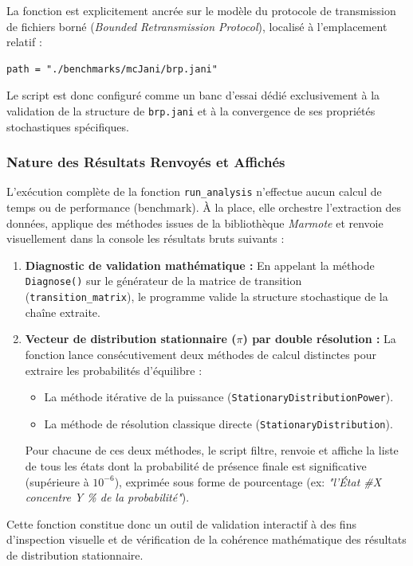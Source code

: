 \documentclass[14pt, a4paper]{extarticle}
\begin{document}
La fonction est explicitement ancrée sur le modèle du protocole de transmission de fichiers borné (\textit{Bounded Retransmission Protocol}), localisé à l'emplacement relatif :
\begin{lstlisting}
path = "./benchmarks/mcJani/brp.jani"
\end{lstlisting}
Le script est donc configuré comme un banc d'essai dédié exclusivement à la validation de la structure de \texttt{brp.jani} et à la convergence de ses propriétés stochastiques spécifiques.

\subsubsection{Nature des Résultats Renvoyés et Affichés}
L'exécution complète de la fonction \texttt{run\_analysis} n'effectue aucun calcul de temps ou de performance (benchmark). À la place, elle orchestre l'extraction des données, applique des méthodes issues de la bibliothèque \textit{Marmote} et renvoie visuellement dans la console les résultats bruts suivants :

\begin{enumerate}
    \item \textbf{Diagnostic de validation mathématique :} En appelant la méthode \texttt{Diagnose()} sur le générateur de la matrice de transition (\texttt{transition\_matrix}), le programme valide la structure stochastique de la chaîne extraite.
    \item \textbf{Vecteur de distribution stationnaire ($\pi$) par double résolution :} La fonction lance consécutivement deux méthodes de calcul distinctes pour extraire les probabilités d'équilibre :
    \begin{itemize}
        \item La méthode itérative de la puissance (\texttt{StationaryDistributionPower}).
        \item La méthode de résolution classique directe (\texttt{StationaryDistribution}).
    \end{itemize}
    Pour chacune de ces deux méthodes, le script filtre, renvoie et affiche la liste de tous les états dont la probabilité de présence finale est significative (supérieure à $10^{-6}$), exprimée sous forme de pourcentage (ex: \textit{"l'État \#X concentre Y \% de la probabilité"}).
\end{enumerate}

Cette fonction constitue donc un outil de validation interactif à des fins d'inspection visuelle et de vérification de la cohérence mathématique des résultats de distribution stationnaire.
\end{document}

